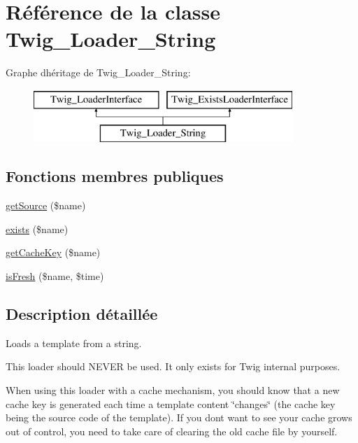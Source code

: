 \hypertarget{class_twig___loader___string}{}\section{Référence de la classe Twig\+\_\+\+Loader\+\_\+\+String}
\label{class_twig___loader___string}
Graphe d\textquotesingle{}héritage de Twig\+\_\+\+Loader\+\_\+\+String\+:\begin{figure}[H]
\begin{center}
\leavevmode
\includegraphics[height=2.000000cm]{class_twig___loader___string}
\end{center}
\end{figure}
\subsection*{Fonctions membres publiques}
\begin{DoxyCompactItemize}
\item 
\hyperlink{class_twig___loader___string_a8c6017d8ed0800a8d6b201883fcfb4bd}{get\+Source} (\$name)
\item 
\hyperlink{class_twig___loader___string_a0909de156d39accf2e3c52f4bce3765f}{exists} (\$name)
\item 
\hyperlink{class_twig___loader___string_aaf1587bcc7c8f06e87be6ccaf76fb6ea}{get\+Cache\+Key} (\$name)
\item 
\hyperlink{class_twig___loader___string_a3ee0419b212dc4f6f1e8a5a615423ad8}{is\+Fresh} (\$name, \$time)
\end{DoxyCompactItemize}


\subsection{Description détaillée}
Loads a template from a string.

This loader should N\+E\+V\+ER be used. It only exists for Twig internal purposes.

When using this loader with a cache mechanism, you should know that a new cache key is generated each time a template content \char`\"{}changes\char`\"{} (the cache key being the source code of the template). If you don\textquotesingle{}t want to see your cache grows out of control, you need to take care of clearing the old cache file by yourself.

